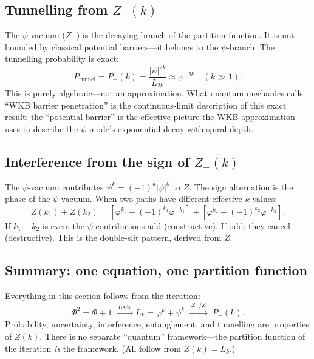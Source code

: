 \documentclass[12pt,a4paper]{article}
\begin{document}
\subsection{Tunnelling from $Z_-(k)$}

The $\psi$-vacuum ($Z_-$) is the decaying branch of the partition function. It is not bounded by classical potential barriers---it belongs to the $\psi$-branch. The tunnelling probability is exact:
\begin{equation}
P_{\text{tunnel}} = P_-(k) = \frac{|\psi|^{2k}}{L_{2k}} \approx \varphi^{-2k} \quad (k \gg 1).
\end{equation}
This is purely algebraic---not an approximation. What quantum mechanics calls ``WKB barrier penetration'' is the continuous-limit description of this exact result: the ``potential barrier'' is the effective picture the WKB approximation uses to describe the $\psi$-mode's exponential decay with spiral depth.

\subsection{Interference from the sign of $Z_-(k)$}

The $\psi$-vacuum contributes $\psi^k = (-1)^k |\psi|^k$ to $Z$. The sign alternation is the phase of the $\psi$-vacuum. When two paths have different effective $k$-values:
\begin{equation}
Z(k_1) + Z(k_2) = [\varphi^{k_1} + (-1)^{k_1}\varphi^{-k_1}] + [\varphi^{k_2} + (-1)^{k_2}\varphi^{-k_2}].
\end{equation}
If $k_1 - k_2$ is even: the $\psi$-contributions add (constructive). If odd: they cancel (destructive). This is the double-slit pattern, derived from $Z$.

\subsection{Summary: one equation, one partition function}

Everything in this section follows from the iteration:
\begin{equation}
\Phi^2{=}\Phi{+}1 \;\xrightarrow{\;\text{roots}\;} L_k = \varphi^k + \psi^k \;\xrightarrow{\;Z_+/Z\;}\; P_+(k).
\end{equation}
Probability, uncertainty, interference, entanglement, and tunnelling are properties of $Z(k)$. There is no separate ``quantum'' framework---the partition function of the iteration \emph{is} the framework. (All follow from $Z(k) = L_k$.)
\end{document}
